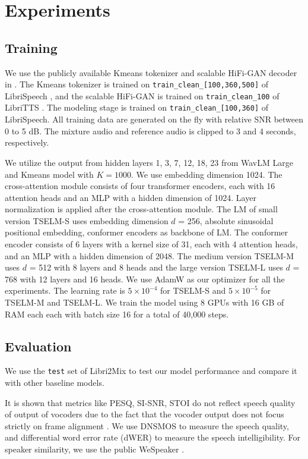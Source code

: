\documentclass[conference]{IEEEtran}
\begin{document}
\section{Experiments}

\subsection{Training}

We use the publicly available Kmeans tokenizer and scalable 
HiFi-GAN decoder in \cite{speechbrain}. The Kmeans tokenizer
is trained on \texttt{train\_clean\_[100,360,500]} of
LibriSpeech \cite{librispeech}, and the scalable HiFi-GAN is trained on \texttt{train\_clean\_100} of 
LibriTTS \cite{libritts}. The modeling stage is trained on 
\texttt{train\_clean\_[100,360]} of LibriSpeech. All training data are 
generated on the fly with relative SNR between 0 to 5 dB. The mixture audio and reference audio is clipped to 3 and 4 seconds, respectively.

We utilize the output from hidden layers 1, 3, 7, 12, 18, 23 from WavLM Large and Kmeans model with 
\(K=1000\).
We use embedding dimension 1024.  The cross-attention module consists of four transformer encoders, each with 16 attention heads and an MLP with a hidden dimension of 1024. Layer normalization is applied after the cross-attention module.
The LM of small version TSELM-S uses 
embedding dimension \(d\) = 256, absolute sinusoidal positional embedding, conformer encoders as backbone of LM. The conformer encoder consists of 6 layers with a kernel size of 31, each with 4 attention heads, and an MLP with a hidden dimension of 2048. The medium version TSELM-M uses \(d\) = 512 with 8 layers and 8 heads and the large version TSELM-L uses 
\(d\) = 768 with 12 layers and 16 heads. We use AdamW as 
our optimizer for all the experiments. The learning rate 
is \(5 \times 10^{-4}\) for TSELM-S and \(5 \times 10^{-5}\) for TSELM-M and TSELM-L. We train the model using 8 GPUs with 16 GB of RAM each each with batch size 16 for a total of 40,000 steps.


\subsection{Evaluation}



We use the \texttt{test} set of Libri2Mix \cite{librimix} to test our model performance and compare it with 
other baseline models. 

It is shown that metrics like PESQ, SI-SNR, STOI do not reflect speech quality of output of 
vocoders due to the fact that the vocoder output does not focus strictly on frame alignment
\cite{tokensplit,selm}. We use DNSMOS \cite{dnsmos} to measure the speech quality, and differential 
word error 
rate (dWER) \cite{dwer} to measure the speech intelligibility. For speaker similarity, we use the 
public WeSpeaker \cite{wespeaker}.
\end{document}
